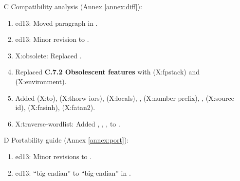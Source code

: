 \begin{itemize}
	\item[C] Compatibility analysis (Annex \ref{annex:diff}):	%
		\begin{enumerate}
		\item \textsf{ed13}: Moved paragraph in .
		\item \textsf{ed13}: Minor revision to .
		\item \textsf{X:obsolete}: Replaced .
		\item Replaced \textbf{C.7.2 Obsolescent features} with
			 (\textsf{X:fpstack}) and
			 (\textsf{X:environment}).
		\item Added
					(\textsf{X:to}),
					(\textsf{X:thorw-iors}),
					(\textsf{X:locals}),
			,	(\textsf{X:number-prefix}),
			,	(\textsf{X:source-id}),
				(\textsf{X:fasinh}),
				(\textsf{X:fatan2}).
		\item \textsf{X:traverse-wordlist}: Added ,
			, , \linebreak
			 to .
	\end{enumerate}

	\item[D] Portability guide (Annex \ref{annex:port}):			%
		\begin{enumerate}
		\item \textsf{ed13}: Minor revisions to .
		\item \textsf{ed13}: ``big endian'' to ``big-endian'' in .
		\end{enumerate}
	\end{itemize}


